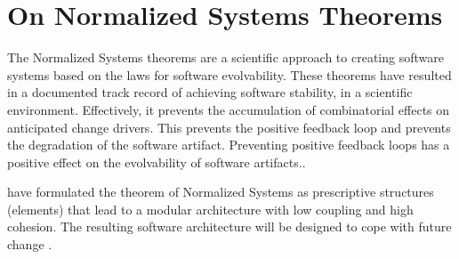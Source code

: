 \section{On Normalized Systems Theorems}

The Normalized Systems theorems are a scientific approach to creating software systems
based on the laws for software evolvability. These theorems have resulted in a documented
track record of achieving software stability, in a scientific environment. Effectively, it
prevents the accumulation of combinatorial effects on anticipated change drivers. This
prevents the positive feedback loop and prevents the degradation of the software artifact.
Preventing positive feedback loops has a positive effect on the evolvability of software
artifacts.\parencite[]{mannaert_normalized_2009}. 

\citeauthor[]{mannaert_normalized_2009} have formulated the theorem of Normalized Systems
as prescriptive structures (elements) that lead to a modular architecture with low
coupling and high cohesion. The resulting software architecture will be designed to cope
with future change \parencites[]{mannaert_normalized_2009}.